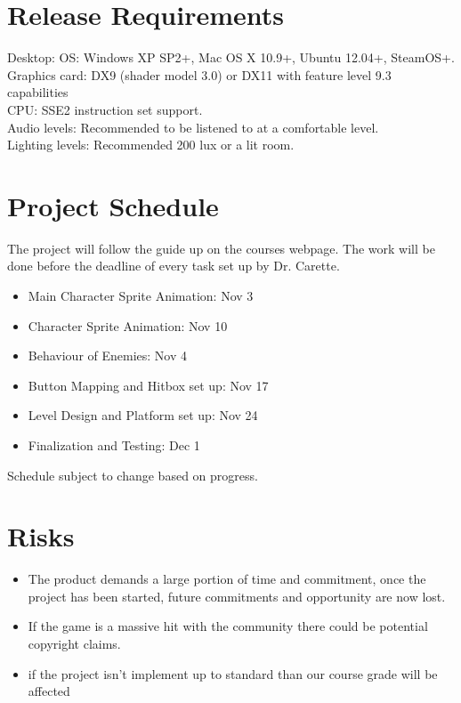 \documentclass{article}
\begin{document}
\section{Release Requirements}
Desktop: OS: Windows XP SP2+, Mac OS X 10.9+, Ubuntu 12.04+, SteamOS+. \\
Graphics card: DX9 (shader model 3.0) or DX11 with feature level 9.3 capabilities\\
CPU: SSE2 instruction set support. \\
Audio levels: Recommended to be listened to at a comfortable level. \\
Lighting levels: Recommended 200 lux or a lit room.

\section{Project Schedule}
The project will follow the guide up on the courses webpage. The work will be done before the deadline of every task set up by Dr. Carette.\\
\begin{itemize}
  \item Main Character Sprite Animation: Nov 3
  \item Character Sprite Animation: Nov 10
  \item Behaviour of Enemies: Nov 4
  \item Button Mapping and Hitbox set up: Nov 17
  \item Level Design and Platform set up: Nov 24
  \item Finalization and Testing: Dec 1
\end{itemize}
Schedule subject to change based on progress.

\section{Risks}
\begin{itemize}
  \item The product demands a large portion of time and commitment, once the project has been started, future commitments and opportunity are now lost.
  \item If the game is a massive hit with the community  there could be potential copyright claims.
  \item if the project isn’t implement up to standard than our course grade will be affected 
\end{itemize}
\end{document}
